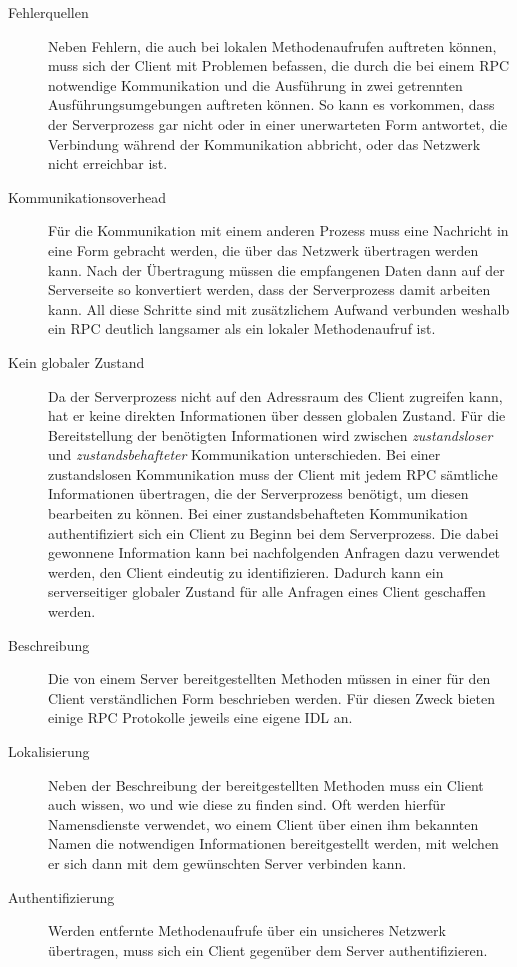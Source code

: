 \begin{description}
\item[Fehlerquellen] Neben Fehlern, die auch bei lokalen Methodenaufrufen
auftreten können, muss sich der Client mit Problemen befassen, die durch die
bei einem \ac{RPC} notwendige Kommunikation und die Ausführung in zwei
getrennten Ausführungsumgebungen auftreten können. So kann es vorkommen, dass der
Serverprozess gar nicht oder in einer unerwarteten Form antwortet, die
Verbindung während der Kommunikation abbricht, oder das Netzwerk nicht
erreichbar ist.
\item[Kommunikationsoverhead] Für die Kommunikation mit einem anderen Prozess
muss eine Nachricht in eine Form gebracht werden, die über das Netzwerk
übertragen werden kann. Nach der Übertragung müssen die empfangenen Daten dann
auf der Serverseite so konvertiert werden, dass der Serverprozess damit arbeiten
kann. All diese Schritte sind mit zusätzlichem Aufwand verbunden weshalb ein
\ac{RPC} deutlich langsamer als ein lokaler Methodenaufruf ist.
\item[Kein globaler Zustand] Da der Serverprozess nicht auf den Adressraum des
Client zugreifen kann, hat er keine direkten Informationen über dessen globalen
Zustand. Für die Bereitstellung der benötigten Informationen wird zwischen
\emph{zustandsloser} und \emph{zustandsbehafteter} Kommunikation unterschieden.
Bei einer zustandslosen Kommunikation muss der Client mit jedem \ac{RPC}
sämtliche Informationen übertragen, die der Serverprozess benötigt, um diesen
bearbeiten zu können. Bei einer zustandsbehafteten Kommunikation authentifiziert
sich ein Client zu Beginn bei dem Serverprozess. Die dabei gewonnene
Information kann bei nachfolgenden Anfragen dazu verwendet werden, den Client
eindeutig zu identifizieren. Dadurch kann ein serverseitiger globaler Zustand für
alle Anfragen eines Client geschaffen werden.
\item[Beschreibung] Die von einem Server bereitgestellten Methoden müssen in
einer für den Client verständlichen Form beschrieben werden. Für diesen
Zweck bieten einige \ac{RPC} Protokolle jeweils eine eigene \ac{IDL} an.
\item[Lokalisierung] Neben der Beschreibung der bereitgestellten Methoden
muss ein Client auch wissen, wo und wie diese zu finden sind. Oft werden
hierfür Namensdienste verwendet, wo einem Client über einen ihm bekannten Namen
die notwendigen Informationen bereitgestellt werden, mit welchen er sich
dann mit dem gewünschten Server verbinden kann.
\item[Authentifizierung] Werden entfernte Methodenaufrufe über ein unsicheres
Netzwerk übertragen, muss sich ein Client gegenüber dem Server authentifizieren.
\end{description}

